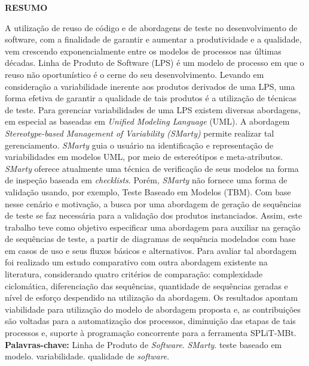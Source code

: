 \clearpage
\thispagestyle{empty}

\noindent{\large\bf\dadoTitulo}
\noindent{\large\dadoSubTitulo}

\normalsize
\begin{center}	
	\vspace*{0.5cm}
	\textbf{RESUMO}
\end{center}
A utilização de reuso de código e de abordagens de teste no desenvolvimento de software, com a finalidade de garantir e aumentar a produtividade e a qualidade, vem crescendo exponencialmente entre os modelos de processos nas últimas décadas. Linha de Produto de Software (LPS) é um modelo de processo em que o reuso não oportunístico é o cerne do seu desenvolvimento. Levando em consideração a variabilidade inerente aos produtos derivados de uma LPS, uma forma efetiva de garantir a qualidade de tais produtos é a utilização de técnicas de teste. Para gerenciar variabilidades de uma LPS existem diversas abordagens, em especial as baseadas em \textit{Unified Modeling Language} (UML). A abordagem \textit{Stereotype-based Management of Variability (SMarty)} permite realizar tal gerenciamento. \textit{SMarty} guia o usuário na identificação e representação de variabilidades em modelos UML, por meio de estereótipos e meta-atributos. \textit{SMarty} oferece atualmente uma técnica de verificação de seus modelos na forma de inspeção baseada em \textit{checklists}. Porém, \textit{SMarty} não fornece uma forma de validação usando, por exemplo, Teste Baseado em Modelos (TBM). Com base nesse cenário e motivação, a busca por uma abordagem de geração de sequências de teste se faz necessária para a validação dos produtos instanciados. Assim, este trabalho teve como objetivo especificar uma abordagem para auxiliar na geração de sequências de teste, a partir de diagramas de sequência modelados com base em casos de uso e seus fluxos básicos e alternativos. Para avaliar tal abordagem foi realizado um estudo comparativo com outra abordagem existente na literatura, considerando quatro critérios de comparação: complexidade ciclomática, diferenciação das sequências, quantidade de sequências geradas e nível de esforço despendido na utilização da abordagem. Os resultados apontam viabilidade para utilização do modelo de abordagem proposta e, as contribuições são voltadas para a automatização dos processos, diminuição das etapas de tais processos e, suporte à programação concorrente para a ferramenta SPLiT-MBt.
\\

\noindent 
\textbf{Palavras-chave:} Linha de Produto de \textit{Software}. \textit{SMarty}. teste baseado em modelo. variabilidade. qualidade de \textit{software}.

\pagebreak
